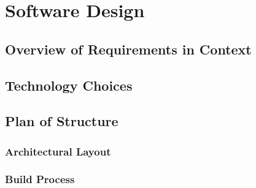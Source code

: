 \section{Software Design}
  \subsection{Overview of Requirements in Context}
  \subsection{Technology Choices}
  \subsection{Plan of Structure}
    \subsubsection{Architectural Layout}
    \subsubsection{Build Process}

